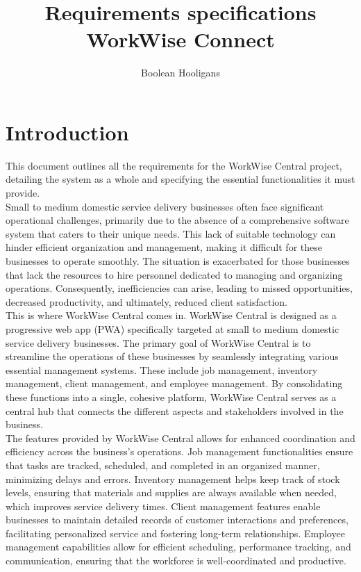 \documentclass{article}
\title{%
	Requirements specifications \\
	\large WorkWise Connect}
\author{Boolean Hooligans}
\begin{document}
	
	\maketitle
	\newpage
	
	\section*{Introduction}	
	
	This document outlines all the requirements for the WorkWise Central project, detailing the system as a whole and specifying the essential functionalities it must provide.\\
	
	Small to medium domestic service delivery businesses often face significant operational challenges, primarily due to the absence of a comprehensive software system that caters to their unique needs. This lack of suitable technology can hinder efficient organization and management, making it difficult for these businesses to operate smoothly. The situation is exacerbated for those businesses that lack the resources to hire personnel dedicated to managing and organizing operations. Consequently, inefficiencies can arise, leading to missed opportunities, decreased productivity, and ultimately, reduced client satisfaction.\\
	
	This is where WorkWise Central comes in. WorkWise Central is designed as a progressive web app (PWA) specifically targeted at small to medium domestic service delivery businesses. The primary goal of WorkWise Central is to streamline the operations of these businesses by seamlessly integrating various essential management systems. These include job management, inventory management, client management, and employee management. By consolidating these functions into a single, cohesive platform, WorkWise Central serves as a central hub that connects the different aspects and stakeholders involved in the business.\\
	
	The features provided by WorkWise Central allows for enhanced coordination and efficiency across the business’s operations. Job management functionalities ensure that tasks are tracked, scheduled, and completed in an organized manner, minimizing delays and errors. Inventory management helps keep track of stock levels, ensuring that materials and supplies are always available when needed, which improves service delivery times. Client management features enable businesses to maintain detailed records of customer interactions and preferences, facilitating personalized service and fostering long-term relationships. Employee management capabilities allow for efficient scheduling, performance tracking, and communication, ensuring that the workforce is well-coordinated and productive.\\
	
\end{document}
